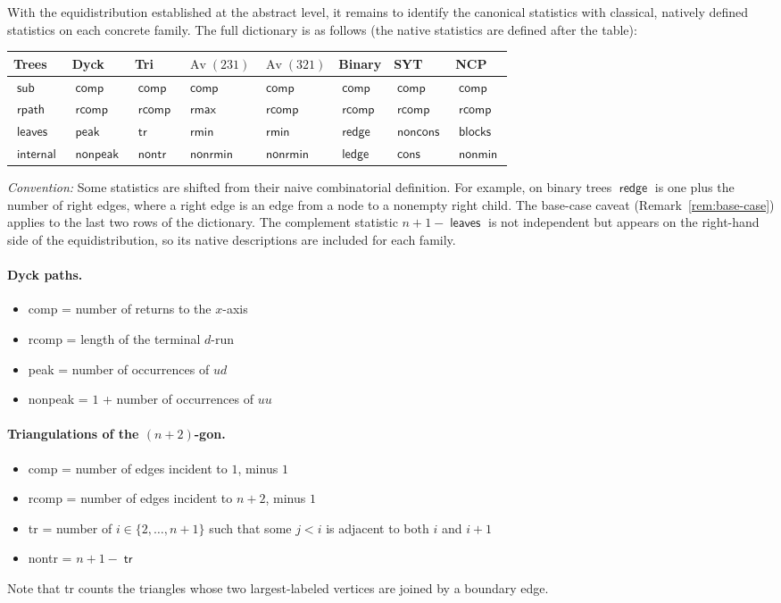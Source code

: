 \documentclass[a4paper,11pt]{article}
\theoremstyle{definition}
\DeclareMathOperator{\comp}{\mathsf{comp}}
\DeclareMathOperator{\rcomp}{\mathsf{rcomp}}
\DeclareMathOperator{\rpath}{\mathsf{rpath}}
\DeclareMathOperator{\leaves}{\mathsf{leaves}}
\DeclareMathOperator{\internal}{\mathsf{internal}}
\DeclareMathOperator{\peak}{\mathsf{peak}}
\DeclareMathOperator{\nonpeak}{\mathsf{nonpeak}}
\DeclareMathOperator{\tr}{\mathsf{tr}}
\DeclareMathOperator{\nontr}{\mathsf{nontr}}
\DeclareMathOperator{\rmin}{\mathsf{rmin}}
\DeclareMathOperator{\nonrmin}{\mathsf{nonrmin}}
\DeclareMathOperator{\rmax}{\mathsf{rmax}}
\DeclareMathOperator{\redge}{\mathsf{redge}}
\DeclareMathOperator{\ledge}{\mathsf{ledge}}
\DeclareMathOperator{\cons}{\mathsf{cons}}
\DeclareMathOperator{\noncons}{\mathsf{noncons}}
\DeclareMathOperator{\blocks}{\mathsf{blocks}}
\DeclareMathOperator{\nonmin}{\mathsf{nonmin}}
\DeclareMathOperator{\subtrees}{\mathsf{sub}}
\DeclareMathOperator{\Av}{Av}
\begin{document}
With the equidistribution established at the abstract
level, it remains to identify the canonical statistics with
classical, natively defined statistics on each concrete
family. The full dictionary is as follows (the native statistics
are defined after the table):

\begin{center}
\renewcommand{\arraystretch}{1.3}
\begin{tabular}{llllllll}
Trees & Dyck & Tri & $\Av(231)$ & $\Av(321)$ &
  Binary & SYT & NCP \\
\hline
$\subtrees$ & $\comp$ & $\comp$ & $\comp$ & $\comp$ & $\comp$ & $\comp$
  & $\comp$ \\
$\rpath$ & $\rcomp$ & $\rcomp$ & $\rmax$ & $\rcomp$ & $\rcomp$
  & $\rcomp$ & $\rcomp$ \\
$\leaves$ & $\peak$ & $\tr$ & $\rmin$ & $\rmin$ & $\redge$
  & $\noncons$ & $\blocks$ \\
$\internal$ & $\nonpeak$ & $\nontr$ & $\nonrmin$ & $\nonrmin$
  & $\ledge$ & $\cons$ & $\nonmin$ \\
\end{tabular}
\end{center}

\emph{Convention:} Some statistics are shifted from
their naive combinatorial definition. For example, on
binary trees $\redge$ is one plus the number of right
edges, where a right edge is an edge from a node to a
nonempty right child. The
base-case caveat (Remark~\ref{rem:base-case}) applies to
the last two rows of the dictionary. The complement
statistic $n + 1 - \leaves$ is not independent but
appears on the right-hand side of the equidistribution,
so its native descriptions are included for each family.

\paragraph{Dyck paths.}
\begin{itemize}
\item comp = number of returns to the $x$-axis
\item rcomp = length of the terminal $d$-run
\item peak = number of occurrences of $ud$
\item nonpeak = $1$ + number of occurrences of $uu$
\end{itemize}

\paragraph{Triangulations of the $(n{+}2)$-gon.}
\begin{itemize}
\item comp = number of edges incident to $1$, minus $1$
\item rcomp = number of edges incident to $n{+}2$, minus $1$
\item tr = number of $i \in \{2, \ldots, n{+}1\}$ such
  that some $j < i$ is adjacent to both $i$ and $i{+}1$
\item nontr = $n + 1 - \tr$
\end{itemize}
Note that tr counts the triangles whose two largest-labeled vertices
are joined by a boundary edge.
\end{document}
